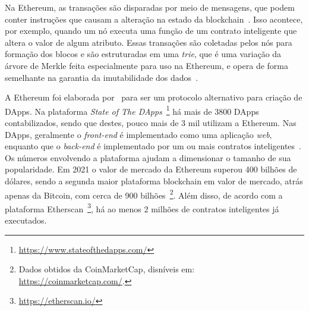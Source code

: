 Na Ethereum, as transações são disparadas por meio de mensagens, que podem conter instruções que causam a alteração na estado da blockchain~\cite{wood2014ethereum-yellow-paper}. Isso acontece, por exemplo, quando um nó executa uma função de um contrato inteligente que altera o valor de algum atributo. Essas transações são coletadas pelos nós para formação dos blocos e são estruturadas em uma \textit{trie}, que é uma variação da árvore de Merkle feita especialmente para uso na Ethereum, e opera de forma semelhante na garantia da imutabilidade dos dados~\cite{wood2014ethereum-yellow-paper}.

A Ethereum foi elaborada por~ para ser um protocolo alternativo para criação de DApps. Na plataforma \textit{State of The DApps}~\footnote{\url{https://www.stateofthedapps.com/}} há mais de 3800 DApps contabilizados, sendo que destes, pouco mais de 3 mil utilizam a Ethereum. Nas DApps, geralmente o \textit{front-end} é implementado como uma aplicação \textit{web}, enquanto que o \textit{back-end} é implementado por um ou mais contratos inteligentes~\cite{survey-Hewa2021smart-contract}. Os números envolvendo a plataforma ajudam a dimensionar o tamanho de sua popularidade. Em 2021 o valor de mercado da Ethereum superou 400 bilhões de dólares, sendo a segunda maior plataforma blockchain em valor de mercado, atrás apenas da Bitcoin, com cerca de 900 bilhões~\footnote{Dados obtidos da CoinMarketCap, disníveis em: \url{https://coinmarketcap.com/}.}. Além disso, de acordo com a plataforma Etherscan~\footnote{\url{https://etherscan.io/}}, há ao menos 2 milhões de contratos inteligentes já executados.

